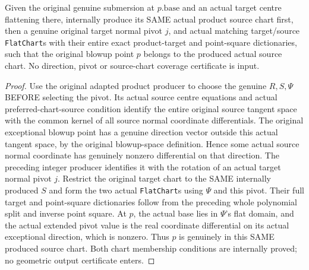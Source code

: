 \begin{theorem}
\label{hir:submersion-adapted-blowup-cover-original-direction}
\leanok
{}

Given the original genuine submersion at $p.\mathrm{base}$ and an actual target centre flattening there, internally produce its SAME actual product source chart first, then a genuine original target normal pivot $j$, and actual matching target/source \texttt{FlatChart}s with their entire exact product-target and point-square dictionaries, such that the original blowup point $p$ belongs to the produced actual source chart. No direction, pivot or source-chart coverage certificate is input.
\end{theorem}
\begin{proof}
Use the original adapted product producer to choose the genuine $R,S,\Psi$ BEFORE selecting the pivot. Its actual source centre equations and actual preferred-chart-source condition identify the entire original source tangent space with the common kernel of all source normal coordinate differentials. The original exceptional blowup point has a genuine direction vector outside this actual tangent space, by the original blowup-space definition. Hence some actual source normal coordinate has genuinely nonzero differential on that direction. The preceding integer producer identifies it with the rotation of an actual target normal pivot $j$. Restrict the original target chart to the SAME internally produced $S$ and form the two actual \texttt{FlatChart}s using $\Psi$ and this pivot. Their full target and point-square dictionaries follow from the preceding whole polynomial split and inverse point square. At $p$, the actual base lies in $\Psi$'s flat domain, and the actual extended pivot value is the real coordinate differential on its actual exceptional direction, which is nonzero. Thus $p$ is genuinely in this SAME produced source chart. Both chart membership conditions are internally proved; no geometric output certificate enters.
\end{proof}


